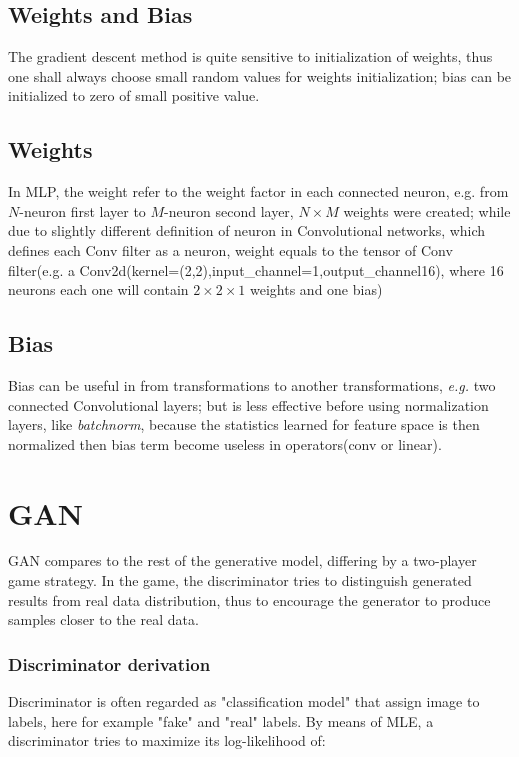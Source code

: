 \documentclass{article}
\begin{document}
{\subsection{Weights and Bias}
The gradient descent method is quite sensitive to initialization of weights, thus one shall always choose small random values for weights initialization; bias can be initialized to zero of small positive value.

\subsection*{Weights}
In MLP, the weight refer to the weight factor in each connected neuron, e.g. from $N$-neuron first layer to $M$-neuron second layer, $N\times M$ weights were created; while due to slightly different definition of neuron in Convolutional networks, which defines each Conv filter as a neuron, weight equals to the tensor of Conv filter(e.g. a Conv2d(kernel=(2,2),input\_channel=1,output\_channel16), where 16 neurons each one will contain $2\times 2\times 1$ weights and one bias)

\subsection*{Bias}
Bias can be useful in from transformations to another transformations, {\emph {e.g.}} two connected Convolutional layers; but is less effective before using normalization layers, like {\emph {batchnorm}}, because the statistics learned for feature space is then normalized then bias term become useless in operators(conv or linear).

\section{GAN}
GAN compares to the rest of the generative model, differing by a two-player game strategy. In the game, the discriminator tries to distinguish generated results from real data distribution, thus to encourage the generator to produce samples closer to the real data. \\

\subsubsection*{Discriminator derivation}
Discriminator is often regarded as "classification model" that assign image to labels, here for example "fake" and "real" labels. By means of MLE, a discriminator tries to maximize its log-likelihood of:

}
\end{document}
